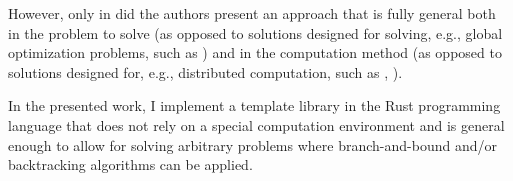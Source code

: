 However, only in \cite{johnson1988modular} did the authors present an approach that is fully
general both in the problem to solve (as opposed to solutions designed for solving, e.g., global
optimization problems, such as \cite{narkawicz2013formalnasa}) and in the computation method
(as opposed to solutions designed for, e.g., distributed computation, such as
\cite{smirnov2017concur}, \cite{finkel1987distrib}).

In the presented work, I
implement a template library in the Rust programming language that does not rely
on a special computation environment and is general enough to allow for solving
arbitrary problems where branch-and-bound and/or backtracking algorithms can be applied.




